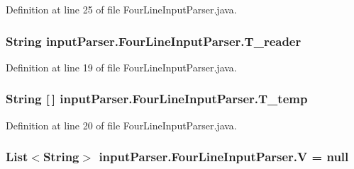 Definition at line 25 of file Four\-Line\-Input\-Parser.\-java.

\hypertarget{classinput_parser_1_1_four_line_input_parser_ac942629b7fbdf58ea902eaccfba356b4}{
\subsubsection[{T\-\_\-reader}]{\setlength{\rightskip}{0pt plus 5cm}String {\bf input\-Parser.\-Four\-Line\-Input\-Parser.\-T\-\_\-reader}}}\label{classinput_parser_1_1_four_line_input_parser_ac942629b7fbdf58ea902eaccfba356b4}


Definition at line 19 of file Four\-Line\-Input\-Parser.\-java.

\hypertarget{classinput_parser_1_1_four_line_input_parser_a17b5ddecc36fdca0cc0be1d613a20caa}{
\subsubsection[{T\-\_\-temp}]{\setlength{\rightskip}{0pt plus 5cm}String \mbox{[}$\,$\mbox{]} {\bf input\-Parser.\-Four\-Line\-Input\-Parser.\-T\-\_\-temp}}}\label{classinput_parser_1_1_four_line_input_parser_a17b5ddecc36fdca0cc0be1d613a20caa}


Definition at line 20 of file Four\-Line\-Input\-Parser.\-java.

\hypertarget{classinput_parser_1_1_four_line_input_parser_a1dd8814f232e9c83f48ead8cf5d9f2b2}{
\subsubsection[{V}]{\setlength{\rightskip}{0pt plus 5cm}List$<$String$>$ {\bf input\-Parser.\-Four\-Line\-Input\-Parser.\-V} = null}}\label{classinput_parser_1_1_four_line_input_parser_a1dd8814f232e9c83f48ead8cf5d9f2b2}


